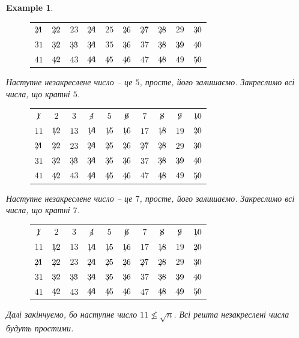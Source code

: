 \documentclass[a4paper, 10pt]{article}
\theoremstyle{theoremdd}
\theoremstyle{theoremdd}
\theoremstyle{theoremdd}
\theoremstyle{theoremdd}
\newtheorem{example}[theorem]{Example}
\theoremstyle{theoremdd}
\theoremstyle{theoremdd}
\theoremstyle{theoremdd}
\theoremstyle{theoremdd}
\begin{document}
\begin{example}
\begin{figure}[H]
\begin{tabular}{cccccccccc}
$\centernot{21}$ & $\centernot{22}$ & $23$ & $\centernot{24}$ & $25$ & $\centernot{26}$ & $\centernot{27}$ & $\centernot{28}$ & $29$ & $\centernot{30}$ \\
$31$ & $\centernot{32}$ & $\centernot{33}$ & $\centernot{34}$ & $35$ & $\centernot{36}$ & $37$ & $\centernot{38}$ & $\centernot{39}$ & $\centernot{40}$ \\
$41$ & $\centernot{42}$ & $43$ & $\centernot{44}$ & $\centernot{45}$ & $\centernot{46}$ & $47$ & $\centernot{48}$ & $49$ & $\centernot{50}$
\end{tabular}
\end{figure}
Наступне незакреслене число -- це $5$, просте, його залишаємо. Закреслимо всі числа, що кратні $5$.
\begin{figure}[H]
\centering
\begin{tabular}{cccccccccc}
$\centernot{1}$ & $2$ & $3$ & $\centernot{4}$ & $5$ & $\centernot{6}$ & $7$ & $\centernot{8}$ & $\centernot{9}$ & $\centernot{10}$ \\
$11$ & $\centernot{12}$ & $13$ & $\centernot{14}$ & $\centernot{15}$ & $\centernot{16}$ & $17$ & $\centernot{18}$ & $19$ & $\centernot{20}$ \\
$\centernot{21}$ & $\centernot{22}$ & $23$ & $\centernot{24}$ & $\centernot{25}$ & $\centernot{26}$ & $\centernot{27}$ & $\centernot{28}$ & $29$ & $\centernot{30}$ \\
$31$ & $\centernot{32}$ & $\centernot{33}$ & $\centernot{34}$ & $\centernot{35}$ & $\centernot{36}$ & $37$ & $\centernot{38}$ & $\centernot{39}$ & $\centernot{40}$ \\
$41$ & $\centernot{42}$ & $43$ & $\centernot{44}$ & $\centernot{45}$ & $\centernot{46}$ & $47$ & $\centernot{48}$ & $49$ & $\centernot{50}$
\end{tabular}
\end{figure}
Наступне незакреслене число -- це $7$, просте, його залишаємо. Закреслимо всі числа, що кратні $7$.
\begin{figure}[H]
\centering
\begin{tabular}{cccccccccc}
$\centernot{1}$ & $2$ & $3$ & $\centernot{4}$ & $5$ & $\centernot{6}$ & $7$ & $\centernot{8}$ & $\centernot{9}$ & $\centernot{10}$ \\
$11$ & $\centernot{12}$ & $13$ & $\centernot{14}$ & $\centernot{15}$ & $\centernot{16}$ & $17$ & $\centernot{18}$ & $19$ & $\centernot{20}$ \\
$\centernot{21}$ & $\centernot{22}$ & $23$ & $\centernot{24}$ & $\centernot{25}$ & $\centernot{26}$ & $\centernot{27}$ & $\centernot{28}$ & $29$ & $\centernot{30}$ \\
$31$ & $\centernot{32}$ & $\centernot{33}$ & $\centernot{34}$ & $\centernot{35}$ & $\centernot{36}$ & $37$ & $\centernot{38}$ & $\centernot{39}$ & $\centernot{40}$ \\
$41$ & $\centernot{42}$ & $43$ & $\centernot{44}$ & $\centernot{45}$ & $\centernot{46}$ & $47$ & $\centernot{48}$ & $\centernot{49}$ & $\centernot{50}$
\end{tabular}
\end{figure}
Далі закінчуємо, бо наступне число $11 \not\leq \sqrt{n}$. Всі решта незакреслені числа будуть простими.
\end{example}
\end{document}
